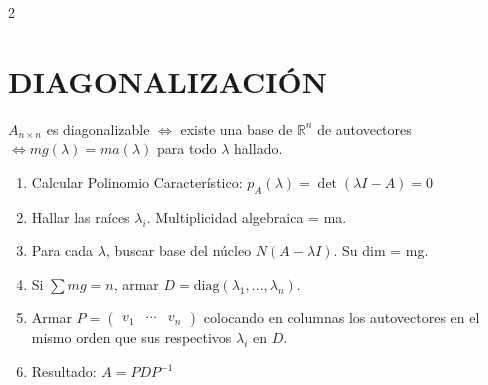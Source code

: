 \documentclass[10pt]{extarticle}
\newenvironment{term}
  {\begin{minipage}{\linewidth}}
  {\end{minipage}\par}
\begin{document}
\begin{multicols}{2}
\begin{term}
\section*{DIAGONALIZACIÓN}
$A_{n\times n}$ es diagonalizable $\iff$ existe una base de $\mathbb{R}^n$ de autovectores $\iff mg(\lambda) = ma(\lambda)$ para todo $\lambda$ hallado.

\begin{enumerate}
\item Calcular Polinomio Característico: $p_A(\lambda) = \det(\lambda I - A) = 0$
\item Hallar las raíces $\lambda_i$. Multiplicidad algebraica = ma.
\item Para cada $\lambda$, buscar base del núcleo $N(A-\lambda I)$. Su dim = mg.
\item Si $\sum mg = n$, armar $D = \mathrm{diag}(\lambda_1,\ldots,\lambda_n)$.
\item Armar $P = \begin{pmatrix}v_1 & \cdots & v_n\end{pmatrix}$ colocando en columnas los autovectores en el mismo orden que sus respectivos $\lambda_i$ en $D$.
\item Resultado: $A = PDP^{-1}$
\end{enumerate}
\end{term}

\begin{term}

\end{term}
\end{multicols}
\end{document}
